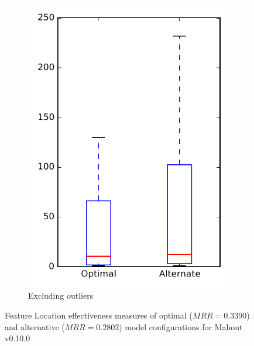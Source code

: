 \begin{figure}
\begin{subfigure}{.4\textwidth}
        \includegraphics[height=0.4\textheight]{figures/combo/flt_rq1_mahout_no_outlier}
        \caption{Excluding outliers}\label{fig:combo:flt:rq1:mahout_no_outlier}
    \end{subfigure}
\caption{Feature Location effectiveness measures of optimal ($MRR=0.3390$) and alternative ($MRR=0.2802$) model configurations for Mahout v0.10.0}
\label{fig:combo:flt:rq1:mahout}
\end{figure}
